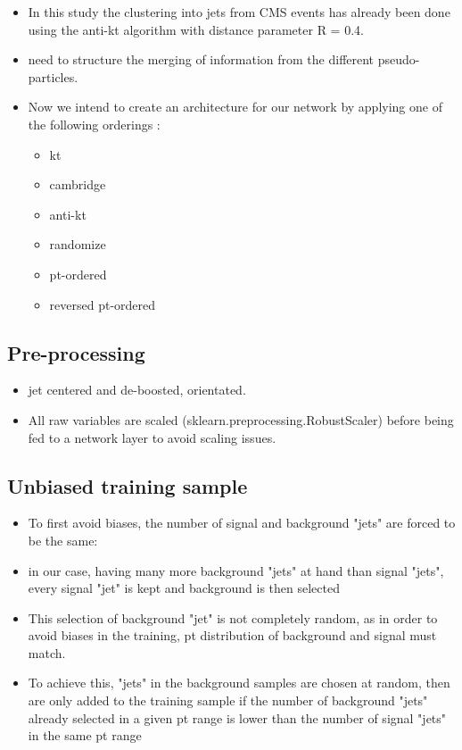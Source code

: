 \begin{itemize}
    \item In this study the clustering into jets from CMS events has already been done using the anti-kt algorithm with distance parameter R = 0.4.
    
    \item need to structure the merging of information from the different pseudo-particles.
    \item Now we intend to create an architecture for our network by applying one of the following orderings :

\begin{itemize}
    \item kt 
    \item cambridge
    \item anti-kt
    \item randomize
    \item pt-ordered
    \item reversed pt-ordered
\end{itemize}



\end{itemize}

\subsection{Pre-processing}

\begin{itemize}
    \item jet centered and de-boosted, orientated.
    \item All raw variables are scaled (sklearn.preprocessing.RobustScaler) before being fed to a network layer to avoid scaling issues.
\end{itemize}


\subsection{Unbiased training sample}

\begin{itemize}
    \item To first avoid biases, the number of signal and background "jets" are forced to be the same:
    \item in our case, having many more background "jets" at hand than signal "jets", every signal "jet" is kept and background is then selected
    \item This selection of background "jet" is not completely random, as in order to avoid biases in the training, pt distribution of background and signal must match.
    \item To achieve this, "jets" in the background samples are chosen at random, then are only added to the training sample if the number of background "jets" already selected in a given pt range is lower than the number of signal "jets" in the same pt range
\end{itemize}

